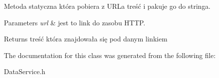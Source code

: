 Metoda statyczna która pobiera z U\+R\+La treść i pakuje go do stringa. 


\begin{DoxyParams}{Parameters}
{\em url} & jest to link do zasobu H\+T\+TP. \\
\hline
\end{DoxyParams}
\begin{DoxyReturn}{Returns}
treść która znajdowała się pod danym linkiem 
\end{DoxyReturn}


The documentation for this class was generated from the following file\+:\begin{DoxyCompactItemize}
\item 
Data\+Service.\+h\end{DoxyCompactItemize}
